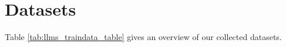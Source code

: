\documentclass[11pt]{article}
\begin{document}

 


\appendix

\section{Datasets} 
\label{appendix:datasets}



Table \ref{tab:llms_traindata_table} gives an overview of our collected datasets.

\label{sec:appendix}
\end{document}
